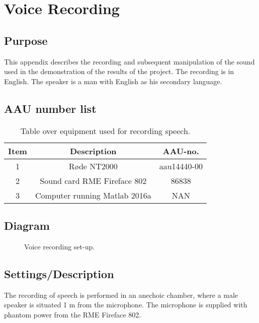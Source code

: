 \section{Voice Recording}
\subsection{Purpose}
This appendix describes the recording and subsequent manipulation of the sound used in the demonstration of the results of the project. The recording is in English. The speaker is a man with English as his secondary language. 

\subsection{AAU number list}
\begin{table}[H]
	\centering
	\begin{tabular}{ c c c } \toprule
		{Item}	& {Description} 						& {AAU-no}. \\ \bottomrule 
		1	& Røde NT2000 	& aau14440-00	\\
		2	& Sound card RME Fireface 802	& 86838 		\\
		3	& Computer running Matlab 2016a	 & 	NAN	\\
		\bottomrule
	\end{tabular}
	\caption{Table over equipment used for recording speech.}
	\label{tab:VoiceRec}
\end{table}

\subsection{Diagram}
\begin{figure}[H]
	\centering
	\caption{Voice recording set-up.}
	\label{fig:VoiceRecording}
\end{figure}

\subsection{Settings/Description}
The recording of speech is performed in an anechoic chamber, where a male speaker is situated 1 m from the microphone. The microphone is supplied with phantom power from the RME Fireface 802. \\ 


